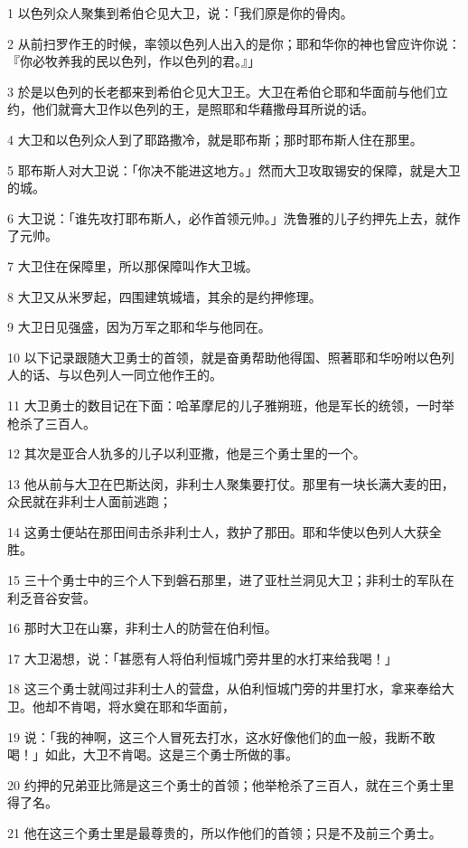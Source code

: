 \par 1 以色列众人聚集到希伯仑见大卫，说：「我们原是你的骨肉。
\par 2 从前扫罗作王的时候，率领以色列人出入的是你；耶和华你的神也曾应许你说：『你必牧养我的民以色列，作以色列的君。』」
\par 3 於是以色列的长老都来到希伯仑见大卫王。大卫在希伯仑耶和华面前与他们立约，他们就膏大卫作以色列的王，是照耶和华藉撒母耳所说的话。
\par 4 大卫和以色列众人到了耶路撒冷，就是耶布斯；那时耶布斯人住在那里。
\par 5 耶布斯人对大卫说：「你决不能进这地方。」然而大卫攻取锡安的保障，就是大卫的城。
\par 6 大卫说：「谁先攻打耶布斯人，必作首领元帅。」洗鲁雅的儿子约押先上去，就作了元帅。
\par 7 大卫住在保障里，所以那保障叫作大卫城。
\par 8 大卫又从米罗起，四围建筑城墙，其余的是约押修理。
\par 9 大卫日见强盛，因为万军之耶和华与他同在。
\par 10 以下记录跟随大卫勇士的首领，就是奋勇帮助他得国、照著耶和华吩咐以色列人的话、与以色列人一同立他作王的。
\par 11 大卫勇士的数目记在下面：哈革摩尼的儿子雅朔班，他是军长的统领，一时举枪杀了三百人。
\par 12 其次是亚合人犰多的儿子以利亚撒，他是三个勇士里的一个。
\par 13 他从前与大卫在巴斯达闵，非利士人聚集要打仗。那里有一块长满大麦的田，众民就在非利士人面前逃跑；
\par 14 这勇士便站在那田间击杀非利士人，救护了那田。耶和华使以色列人大获全胜。
\par 15 三十个勇士中的三个人下到磐石那里，进了亚杜兰洞见大卫；非利士的军队在利乏音谷安营。
\par 16 那时大卫在山寨，非利士人的防营在伯利恒。
\par 17 大卫渴想，说：「甚愿有人将伯利恒城门旁井里的水打来给我喝！」
\par 18 这三个勇士就闯过非利士人的营盘，从伯利恒城门旁的井里打水，拿来奉给大卫。他却不肯喝，将水奠在耶和华面前，
\par 19 说：「我的神啊，这三个人冒死去打水，这水好像他们的血一般，我断不敢喝！」如此，大卫不肯喝。这是三个勇士所做的事。
\par 20 约押的兄弟亚比筛是这三个勇士的首领；他举枪杀了三百人，就在三个勇士里得了名。
\par 21 他在这三个勇士里是最尊贵的，所以作他们的首领；只是不及前三个勇士。

